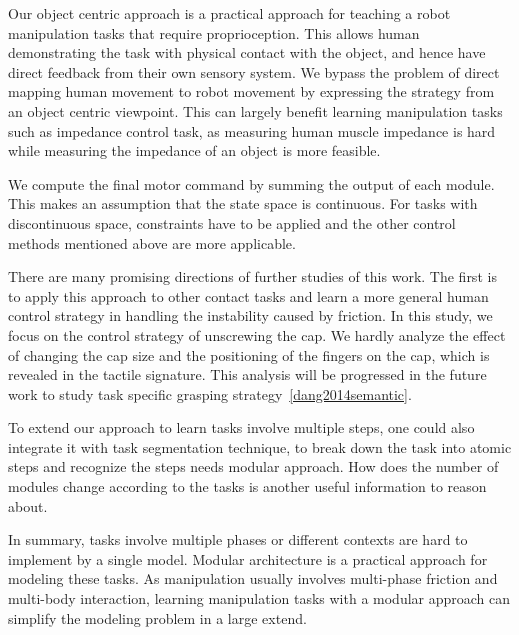 Our object centric approach is a practical approach for teaching a robot manipulation tasks that require proprioception. This allows human demonstrating the task with physical contact with the object, and hence have direct feedback from their own sensory system. We bypass the problem of direct mapping human movement to robot movement by expressing the strategy from an object centric viewpoint. This can largely benefit learning manipulation tasks such as impedance control task, as measuring human muscle impedance is hard while measuring the impedance of an object is more feasible.

We compute the final motor command by summing the output of each module. This makes an assumption that the state space is continuous. For tasks with discontinuous space, constraints have to be applied and the other control methods mentioned above are more applicable.

There are many promising directions of further studies of this work. The first is to apply this approach to other contact tasks and learn a more general human control strategy in handling the instability caused by friction.
In this study, we focus on the control strategy of unscrewing the cap. We hardly analyze the effect of changing the cap size and the positioning of the fingers on the cap, which is revealed in the tactile signature. This analysis will be progressed in the future work to study task specific grasping strategy~\ref{dang2014semantic}.

To extend our approach to learn tasks involve multiple steps, one could also integrate it with task segmentation technique, to break down the task into atomic steps and recognize the steps needs modular approach. How does the number of modules change according to the tasks is another useful information to reason about.


In summary, tasks involve multiple phases or different contexts are hard to implement by a single model. Modular architecture is a practical approach for modeling these tasks. As manipulation usually involves multi-phase friction and multi-body interaction, learning manipulation tasks with a modular approach can simplify the modeling problem in a large extend.

